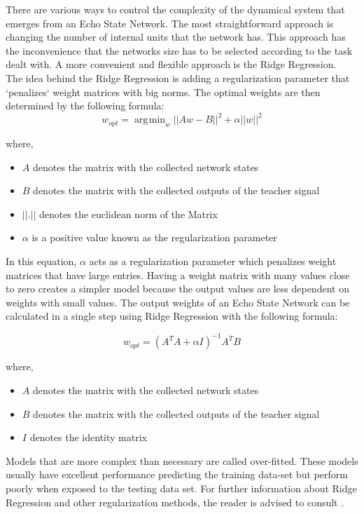 \documentclass[letterpaper,9pt]{article}
\newcommand{\vectornorm}[1]{\left|\left|#1\right|\right|}
\DeclareMathOperator*{\argmin}{\arg\!\min}
\begin{document}
There are various ways to control the complexity of the dynamical system that emerges from an Echo State Network. The most straightforward approach is changing the number of internal units that the network has. This approach has the inconvenience that the networks size has to be selected according to the task dealt with. A more convenient and flexible approach is the Ridge Regression.\\

The idea behind the Ridge Regression is adding a regularization parameter that `penalizes` weight matrices with big norms. The optimal weights are then determined by the following formula:
\[
w_{opt} = \argmin_{w} \vectornorm{Aw-B}^2 + \alpha \vectornorm{w}^2
\]

where,
\begin{itemize}
\item $A$ denotes the matrix with the collected network states
\item $B$ denotes the matrix with the collected outputs of the teacher signal
\item $\vectornorm{.}$ denotes the euclidean norm of the Matrix
\item $\alpha$ is a positive value known as the regularization parameter
\end{itemize}

In this equation, $\alpha$ acts as a regularization parameter which penalizes weight matrices that have large entries. Having a weight matrix with many values close to zero creates a simpler model because the output values are less dependent on weights with small values. The output weights of an Echo State Network can be calculated in a single step using Ridge Regression with the following formula:

\[
w_{opt} = (A^TA+\alpha I)^{-1}A^TB
\]

where,
\begin{itemize}
\item $A$ denotes the matrix with the collected network states
\item $B$ denotes the matrix with the collected outputs of the teacher signal
\item $I$ denotes the identity matrix
\end{itemize}

Models that are more complex than necessary are called over-fitted. These models usually have excellent performance predicting the training data-set but perform poorly when exposed to the testing data set. For further information about Ridge Regression and other regularization methods, the reader is advised to consult \cite{ESNVerstraeten}.
\end{document}

